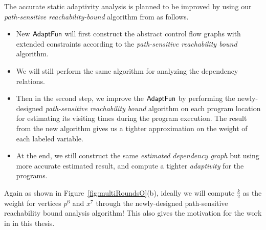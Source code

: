 The accurate static adaptivity analysis is planned to be improved by using our \emph{path-sensitive reachability-bound} algorithm
from  as follows.
\begin{itemize}
 \item New $\textsf{AdaptFun}$ will first construct the abstract control flow graphs with extended constraints
 according to the \emph{path-sensitive reachability bound} algorithm.

 \item We will still perform the same algorithm for analyzing the dependency relations.
 \item Then in the second step, we improve the $\textsf{AdaptFun}$ by
 performing the newly-designed \emph{path-sensitive reachability bound} algorithm 
 on each program location for estimating its visiting times during the program execution.
 The result from the new algorithm 
 gives us a tighter approximation
 on
the weight of each labeled variable.
 \item At the end, we still construct the same \emph{estimated dependency graph}
 but using more accurate estimated result, and compute a tighter \emph{adaptivity} for the programs.
\end{itemize}
Again as shown in Figure~\ref{fig:multiRoundsO}(b), ideally we will compute $\frac{k}{2}$ as the weight for vertices $p^6$ and $x^7$ through the newly-designed path-sensitive reachability bound analysis algorithm!
This also gives the motivation for the work in  in this thesis.

